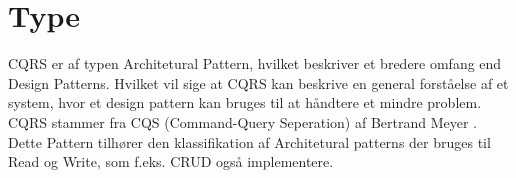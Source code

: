 \section{Type}

CQRS er af typen Architetural Pattern, hvilket beskriver et bredere omfang end Design Patterns. Hvilket vil sige at CQRS kan beskrive en general forståelse af et system, hvor et design pattern kan bruges til at håndtere et mindre problem. CQRS stammer fra CQS (Command-Query Seperation) af Bertrand Meyer . 
Dette Pattern tilhører den klassifikation af Architetural patterns der bruges til Read og Write, som f.eks. CRUD også implementere.
